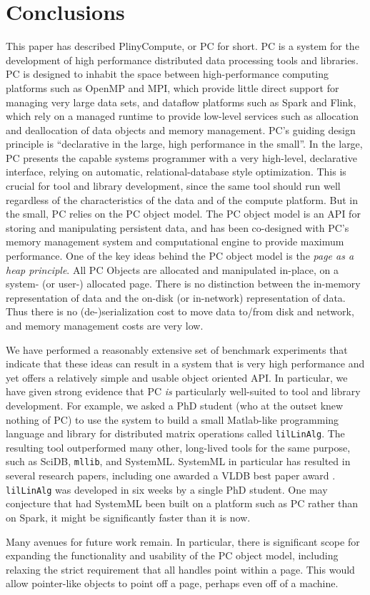 
\section{Conclusions}

This paper has described PlinyCompute, or PC for short.  PC is a system for the development of high performance
distributed data processing tools and libraries.  PC is designed to inhabit the space between
high-performance computing platforms such as OpenMP and MPI, which provide little direct support
for managing very large data sets, and dataflow platforms such as Spark and Flink, which rely on 
a managed runtime to provide low-level services such as allocation and deallocation of data objects and memory management.
PC's guiding design principle is ``declarative in the large,
high performance in the small''.
In the large, PC presents the capable systems programmer with a very high-level, declarative interface, relying on automatic,
relational-database style optimization.  This is crucial for tool and library development, since the same tool should run well
regardless of the characteristics of the data and of the compute platform.  But in the small, PC relies on the PC object model.
The PC object model is an
API for storing and manipulating persistent data, and has been co-designed with PC's memory management
system and computational engine to provide maximum performance.
One of the key ideas behind the PC object model is the \emph{page as a heap principle}. All PC
Objects are allocated and manipulated in-place, on a system- (or user-) allocated page. There is no distinction
between the in-memory representation of data and the on-disk (or in-network) representation of data.
Thus there is no (de-)serialization cost to move data to/from disk and network, and memory management
costs are very low.

We have performed a reasonably extensive set of benchmark experiments that indicate that these ideas can result in 
a system that is very high performance and yet offers a relatively simple and usable object oriented API.  In particular, 
we have given strong evidence that PC \emph{is} particularly well-suited to tool and library development. 
For example, we asked a PhD
student (who at the outset knew nothing of PC) to use the system to build a small Matlab-like programming
language and library for distributed matrix operations called
\texttt{lilLinAlg}.  The resulting tool outperformed many other, long-lived tools
for the same purpose, such as SciDB, \texttt{mllib}, and SystemML.  SystemML in particular has resulted 
in several research papers,
including one awarded a VLDB best paper award \cite{boehm2016systemml}.
\texttt{lilLinAlg} was developed in six weeks by a single PhD student.
One may conjecture that had SystemML been built on a platform such as PC rather than on Spark, it might be significantly
faster than it is now.

Many avenues for future work remain.  In particular, there is significant scope for expanding the functionality and
usability of the PC object model, including relaxing the strict requirement that all handles point within a page.  This
would allow pointer-like objects to point off a page, perhaps even off of a machine.  
